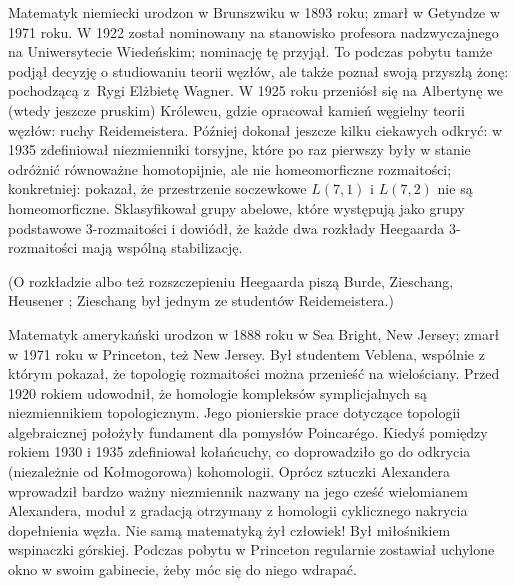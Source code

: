 \begin{remark}
    Matematyk niemiecki urodzon w Brunszwiku w 1893 roku; zmarł w Getyndze w 1971 roku.
    W 1922 został nominowany na stanowisko profesora nadzwyczajnego na Uniwersytecie Wiedeńskim; nominację tę przyjął.
    To podczas pobytu tamże podjął decyzję o studiowaniu teorii węzłów, ale także poznał swoją przyszłą żonę: pochodzącą z~Rygi Elżbietę Wagner.
    W 1925 roku przeniósł się na Albertynę we (wtedy jeszcze pruskim) Królewcu, gdzie opracował kamień węgielny teorii węzłów: ruchy Reidemeistera.
    Później dokonał jeszcze kilku ciekawych odkryć: w 1935 zdefiniował niezmienniki torsyjne, które po raz pierwszy były w stanie odróżnić równoważne homotopijnie, ale nie homeomorficzne rozmaitości; konkretniej: pokazał, że przestrzenie soczewkowe $L(7, 1)$ i $L(7, 2)$ nie są homeomorficzne.
%
%
    Sklasyfikował grupy abelowe, które występują jako grupy podstawowe 3-rozmaitości i dowiódł, że każde dwa rozkłady Heegaarda 3-rozmaitości mają wspólną stabilizację.
%
%
\end{remark}

(O rozkładzie albo też rozszczepieniu Heegaarda piszą Burde, Zieschang, Heusener \cite[s. 44]{burde2014}; Zieschang był jednym ze studentów Reidemeistera.)

\begin{remark}
    Matematyk amerykański urodzon w 1888 roku w Sea Bright, New Jersey; zmarł w 1971 roku w Princeton, też New Jersey.
    Był studentem Veblena, wspólnie z którym pokazał, że topologię rozmaitości można przenieść na wielościany.
    Przed 1920 rokiem udowodnił, że homologie kompleksów symplicjalnych są niezmiennikiem topologicznym.
    Jego pionierskie prace dotyczące topologii algebraicznej położyły fundament dla pomysłów Poincarégo.
    Kiedyś pomiędzy rokiem 1930 i 1935 zdefiniował kołańcuchy, co doprowadziło go do odkrycia (niezależnie od Kołmogorowa) kohomologii.
    Oprócz sztuczki Alexandera wprowadził bardzo ważny niezmiennik nazwany na jego cześć wielomianem Alexandera, moduł z gradacją otrzymany z homologii cyklicznego nakrycia dopełnienia węzła.
    Nie samą matematyką żył człowiek!
    Był miłośnikiem wspinaczki górskiej.
    Podczas pobytu w Princeton regularnie zostawiał uchylone okno w swoim gabinecie, żeby móc się do niego wdrapać.
\end{remark}

